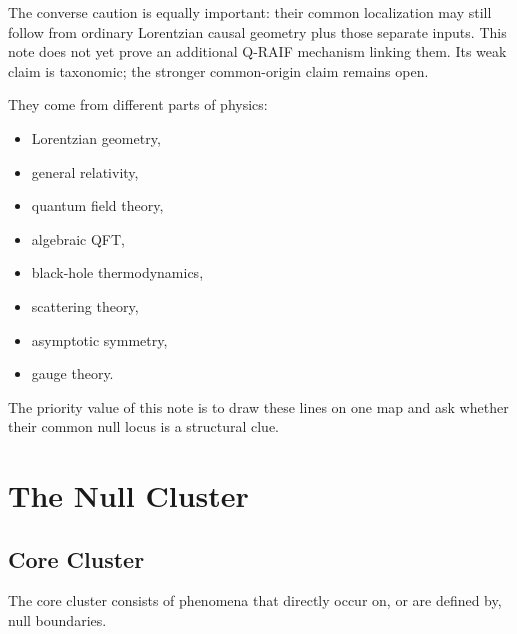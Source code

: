\documentclass[12pt,a4paper]{article}
\theoremstyle{definition}
\theoremstyle{remark}
\newcommand{\tightlist}{%
  \setlength{\itemsep}{0pt}\setlength{\parskip}{0pt}}
\begin{document}
The converse caution is equally important: their common localization may still follow from ordinary Lorentzian causal geometry plus those separate inputs.  This note does not yet prove an additional Q-RAIF mechanism linking them.  Its weak claim is taxonomic; the stronger common-origin claim remains open.

They come from different parts of physics:

\begin{itemize}
\tightlist
\item
  Lorentzian geometry,
\item
  general relativity,
\item
  quantum field theory,
\item
  algebraic QFT,
\item
  black-hole thermodynamics,
\item
  scattering theory,
\item
  asymptotic symmetry,
\item
  gauge theory.
\end{itemize}

The priority value of this note is to draw these lines on one map and
ask whether their common null locus is a structural clue.

\section{The Null Cluster}\label{the-null-cluster}

\subsection{Core Cluster}\label{core-cluster}

The core cluster consists of phenomena that directly occur on, or are
defined by, null boundaries.
\end{document}
